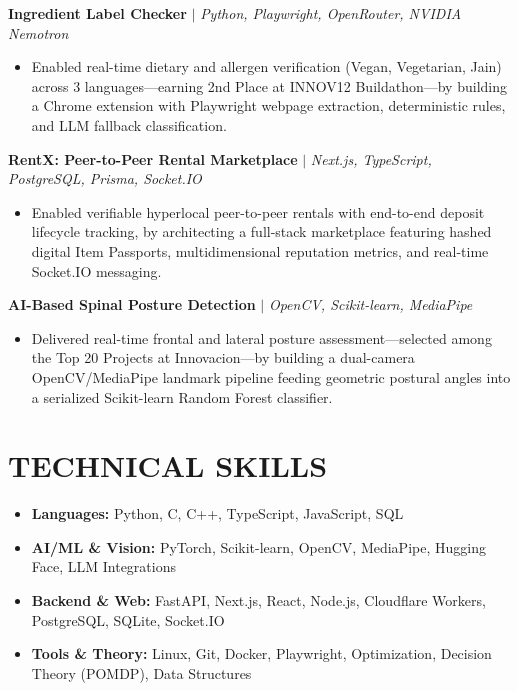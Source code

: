 \documentclass[10pt, a4paper]{article}
\begin{document}
\textbf{Ingredient Label Checker} $|$ \textit{Python, Playwright, OpenRouter, NVIDIA Nemotron}
\begin{itemize}[leftmargin=*, noitemsep, topsep=1pt, parsep=0pt]
    \item Enabled real-time dietary and allergen verification (Vegan, Vegetarian, Jain) across 3 languages---earning 2nd Place at INNOV12 Buildathon---by building a Chrome extension with Playwright webpage extraction, deterministic rules, and LLM fallback classification.
\end{itemize}

\textbf{RentX: Peer-to-Peer Rental Marketplace} $|$ \textit{Next.js, TypeScript, PostgreSQL, Prisma, Socket.IO}
\begin{itemize}[leftmargin=*, noitemsep, topsep=1pt, parsep=0pt]
    \item Enabled verifiable hyperlocal peer-to-peer rentals with end-to-end deposit lifecycle tracking, by architecting a full-stack marketplace featuring hashed digital Item Passports, multidimensional reputation metrics, and real-time Socket.IO messaging.
\end{itemize}

\textbf{AI-Based Spinal Posture Detection} $|$ \textit{OpenCV, Scikit-learn, MediaPipe}
\begin{itemize}[leftmargin=*, noitemsep, topsep=1pt, parsep=0pt]
    \item Delivered real-time frontal and lateral posture assessment---selected among the Top 20 Projects at Innovacion---by building a dual-camera OpenCV/MediaPipe landmark pipeline feeding geometric postural angles into a serialized Scikit-learn Random Forest classifier.
\end{itemize}

\section{TECHNICAL SKILLS}
\begin{itemize}[leftmargin=*, noitemsep, topsep=1pt]
    \item \textbf{Languages:} Python, C, C++, TypeScript, JavaScript, SQL
    \item \textbf{AI/ML \& Vision:} PyTorch, Scikit-learn, OpenCV, MediaPipe, Hugging Face, LLM Integrations
    \item \textbf{Backend \& Web:} FastAPI, Next.js, React, Node.js, Cloudflare Workers, PostgreSQL, SQLite, Socket.IO
    \item \textbf{Tools \& Theory:} Linux, Git, Docker, Playwright, Optimization, Decision Theory (POMDP), Data Structures
\end{itemize}
\end{document}
